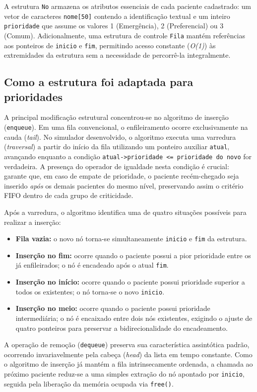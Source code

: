 \documentclass[12pt,a4paper]{article}
\begin{document}
A estrutura \texttt{No} armazena os atributos essenciais de cada paciente cadastrado: um vetor de caracteres \texttt{nome[50]} contendo a identificação textual e um inteiro \texttt{prioridade} que assume os valores 1 (Emergência), 2 (Preferencial) ou 3 (Comum). Adicionalmente, uma estrutura de controle \texttt{Fila} mantém referências aos ponteiros de \texttt{inicio} e \texttt{fim}, permitindo acesso constante (\textit{O(1)}) às extremidades da estrutura sem a necessidade de percorrê-la integralmente.

\subsection{Como a estrutura foi adaptada para prioridades}
A principal modificação estrutural concentrou-se no algoritmo de inserção (\texttt{enqueue}). Em uma fila convencional, o enfileiramento ocorre exclusivamente na cauda (\textit{tail}). No simulador desenvolvido, o algoritmo executa uma varredura (\textit{traversal}) a partir do início da fila utilizando um ponteiro auxiliar \texttt{atual}, avançando enquanto a condição \texttt{atual->prioridade <= prioridade do novo} for verdadeira. A presença do operador de igualdade nesta condição é crucial: garante que, em caso de empate de prioridade, o paciente recém-chegado seja inserido \textit{após} os demais pacientes do mesmo nível, preservando assim o critério FIFO dentro de cada grupo de criticidade.

Após a varredura, o algoritmo identifica uma de quatro situações possíveis para realizar a inserção:
\begin{itemize}
    \item \textbf{Fila vazia:} o novo nó torna-se simultaneamente \texttt{inicio} e \texttt{fim} da estrutura.
    \item \textbf{Inserção no fim:} ocorre quando o paciente possui a pior prioridade entre os já enfileirados; o nó é encadeado após o atual \texttt{fim}.
    \item \textbf{Inserção no início:} ocorre quando o paciente possui prioridade superior a todos os existentes; o nó torna-se o novo \texttt{inicio}.
    \item \textbf{Inserção no meio:} ocorre quando o paciente possui prioridade intermediária; o nó é encaixado entre dois nós existentes, exigindo o ajuste de quatro ponteiros para preservar a bidirecionalidade do encadeamento.
\end{itemize}

A operação de remoção (\texttt{dequeue}) preserva sua característica assintótica padrão, ocorrendo invariavelmente pela cabeça (\textit{head}) da lista em tempo constante. Como o algoritmo de inserção já mantém a fila intrinsecamente ordenada, a chamada ao próximo paciente reduz-se a uma simples extração do nó apontado por \texttt{inicio}, seguida pela liberação da memória ocupada via \texttt{free()}.
\end{document}
